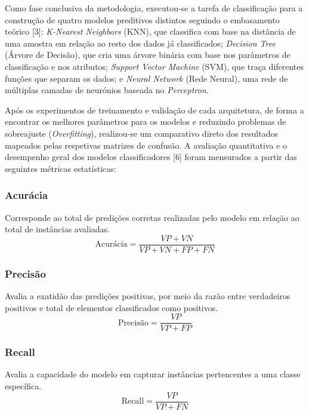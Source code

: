 Como fase conclusiva da metodologia, executou-se a tarefa de classificação para a construção de quatro modelos preditivos distintos seguindo o embasamento teórico [3]: \textit{K-Nearest Neighbors} (KNN), que classifica com base na distância de uma amostra em relação ao resto dos dados já classificados; \textit{Decision Tree} (Árvore de Decisão), que cria uma árvore binária com base nos parâmetros de classificação e nos atributos; \textit{Support Vector Machine} (SVM), que traça diferentes funções que separam os dados; e \textit{Neural Network} (Rede Neural), uma rede de múltiplas camadas de neurónios baseada no \textit{Perceptron}. 

Após os experimentos de treinamento e validação de cada arquitetura, de forma a encontrar os melhores parâmetros para os modelos e reduzindo problemas de sobreajuste (\textit{Overfitting}), realizou-se um comparativo direto dos resultados mapeados pelas respetivas matrizes de confusão. A avaliação quantitativa e o desempenho geral dos modelos classificadores [6] foram mensurados a partir das seguintes métricas estatísticas:

\subsubsection{Acurácia}
Corresponde ao total de predições corretas realizadas pelo modelo em relação ao total de instâncias avaliadas.
\begin{equation}
\text{Acurácia} = \frac{VP + VN}{VP + VN + FP + FN}
\label{eq:accuracy}
\end{equation}

\subsubsection{Precisão}
Avalia a exatidão das predições positivas, por meio da razão entre verdadeiros positivos e total de elementos classificados como positivos.
\begin{equation}
\text{Precisão} = \frac{VP}{VP + FP}
\label{eq:precision}
\end{equation}

\subsubsection{Recall}
Avalia a capacidade do modelo em capturar instâncias pertencentes a uma classe específica.
\begin{equation}
\text{Recall} = \frac{VP}{VP + FN}
\label{eq:recall}
\end{equation}

